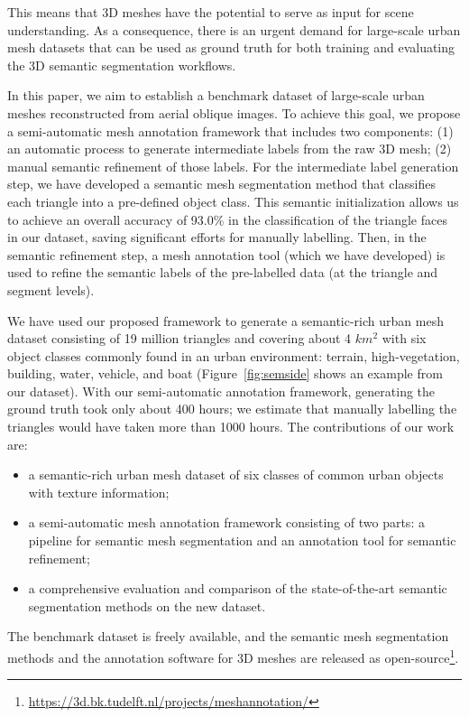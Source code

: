 This means that 3D meshes have the potential to serve as input for scene understanding. 
As a consequence, there is an urgent demand for large-scale urban mesh datasets that can be used as ground truth for both training and evaluating the 3D semantic segmentation workflows.

In this paper, we aim to establish a benchmark dataset of large-scale urban meshes reconstructed from aerial oblique images. 
To achieve this goal, we propose a semi-automatic mesh annotation framework that includes two components: (1) an automatic process to generate intermediate labels from the raw 3D mesh; (2) manual semantic refinement of those labels.
For the intermediate label generation step, we have developed a semantic mesh segmentation method that classifies each triangle into a pre-defined object class. 
This semantic initialization allows us to achieve an overall accuracy of 93.0\% in the classification of the triangle faces in our dataset, saving significant efforts for manually labelling.
Then, in the semantic refinement step, a mesh annotation tool (which we have developed) is used to refine the semantic labels of the pre-labelled data (at the triangle and segment levels).

We have used our proposed framework to generate a semantic-rich urban mesh dataset consisting of 19 million triangles and covering about 4 $km^2$ with six object classes commonly found in an urban environment: terrain, high-vegetation, building, water, vehicle, and boat (Figure~\ref{fig:semside} shows an example from our dataset).
With our semi-automatic annotation framework, generating the ground truth took only about 400 hours; we estimate that manually labelling the triangles would have taken more than 1000 hours. 
The contributions of our work are: 
\begin{itemize}
	\item a semantic-rich urban mesh dataset of six classes of common urban objects with texture information;
	\item a semi-automatic mesh annotation framework consisting of two parts: a pipeline for semantic mesh segmentation and 
	an annotation tool for semantic refinement;
	\item a comprehensive evaluation and comparison of the state-of-the-art semantic segmentation methods on the new dataset.
\end{itemize}
The benchmark dataset is freely available, and the semantic mesh segmentation methods and the annotation software for 3D meshes are released as open-source\footnote{\url{https://3d.bk.tudelft.nl/projects/meshannotation/}}.



